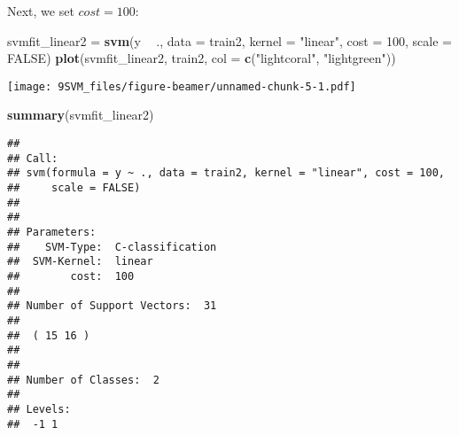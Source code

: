 \documentclass[10pt,ignorenonframetext,]{beamer}
\newenvironment{Shaded}{\begin{snugshade}}{\end{snugshade}}
\newcommand{\KeywordTok}[1]{\textcolor[rgb]{0.13,0.29,0.53}{\textbf{#1}}}
\newcommand{\DataTypeTok}[1]{\textcolor[rgb]{0.13,0.29,0.53}{#1}}
\newcommand{\DecValTok}[1]{\textcolor[rgb]{0.00,0.00,0.81}{#1}}
\newcommand{\StringTok}[1]{\textcolor[rgb]{0.31,0.60,0.02}{#1}}
\newcommand{\OtherTok}[1]{\textcolor[rgb]{0.56,0.35,0.01}{#1}}
\newcommand{\OperatorTok}[1]{\textcolor[rgb]{0.81,0.36,0.00}{\textbf{#1}}}
\newcommand{\NormalTok}[1]{#1}
\begin{document}
\begin{frame}[fragile]

Next, we set \(cost=100\): \footnotesize

\begin{Shaded}
\begin{Highlighting}[]
\NormalTok{svmfit_linear2 =}\StringTok{ }\KeywordTok{svm}\NormalTok{(y }\OperatorTok{~}\StringTok{ }\NormalTok{., }\DataTypeTok{data =}\NormalTok{ train2, }\DataTypeTok{kernel =} \StringTok{"linear"}\NormalTok{, }\DataTypeTok{cost =} \DecValTok{100}\NormalTok{, }
    \DataTypeTok{scale =} \OtherTok{FALSE}\NormalTok{)}
\KeywordTok{plot}\NormalTok{(svmfit_linear2, train2, }\DataTypeTok{col =} \KeywordTok{c}\NormalTok{(}\StringTok{"lightcoral"}\NormalTok{, }\StringTok{"lightgreen"}\NormalTok{))}
\end{Highlighting}
\end{Shaded}

\texttt{[image: 9SVM\_files/figure-beamer/unnamed-chunk-5-1.pdf]}

\end{frame}

\begin{frame}[fragile]

\begin{Shaded}
\begin{Highlighting}[]
\KeywordTok{summary}\NormalTok{(svmfit_linear2)}
\end{Highlighting}
\end{Shaded}

\begin{verbatim}
## 
## Call:
## svm(formula = y ~ ., data = train2, kernel = "linear", cost = 100, 
##     scale = FALSE)
## 
## 
## Parameters:
##    SVM-Type:  C-classification 
##  SVM-Kernel:  linear 
##        cost:  100 
## 
## Number of Support Vectors:  31
## 
##  ( 15 16 )
## 
## 
## Number of Classes:  2 
## 
## Levels: 
##  -1 1
\end{verbatim}

\normalsize

\end{frame}
\end{document}

